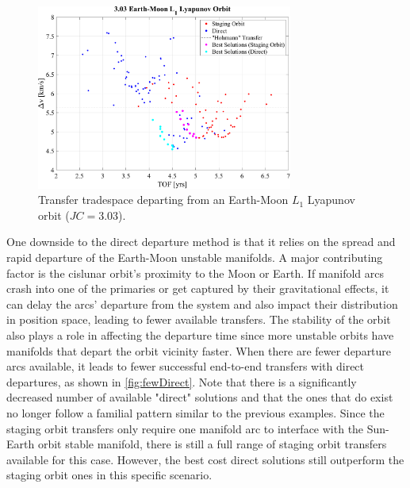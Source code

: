 \begin{figure}[ht]
    \centering
    \includegraphics[width=0.75\textwidth]{figures/TradeSpace_L1Lyapunov_3_03.pdf}
    \caption{Transfer tradespace departing from an Earth-Moon $L_{1}$ Lyapunov orbit ($JC=3.03$).}
    \label{fig:lowBoth}
\end{figure}

One downside to the direct departure method is that it relies on the spread and rapid departure of
the Earth-Moon unstable manifolds. A major contributing factor is the cislunar orbit's proximity to
the Moon or Earth. If manifold arcs crash into one of the primaries or get captured by their
gravitational effects, it can delay the arcs' departure from the system and also impact their
distribution in position space, leading to fewer available transfers. The stability of the orbit
also plays a role in affecting the departure time since more unstable orbits have manifolds that
depart the orbit vicinity faster. When there are fewer departure arcs available, it leads to fewer
successful end-to-end transfers with direct departures, as shown in \cref{fig:fewDirect}. Note that
there is a significantly decreased number of available "direct" solutions and that the ones that do
exist no longer follow a familial pattern similar to the previous examples. Since the staging orbit
transfers only require one manifold arc to interface with the Sun-Earth orbit stable manifold,
there is still a full range of staging orbit transfers available for this case. However, the best
cost direct solutions still outperform the staging orbit ones in this specific scenario.

